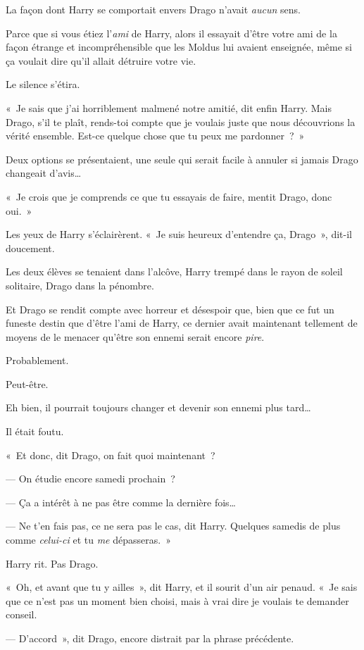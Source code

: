 La façon dont Harry se comportait envers Drago n'avait \emph{aucun} sens.

Parce que si vous étiez l'\emph{ami} de Harry, alors il essayait d'être votre ami de la façon étrange et incompréhensible que les Moldus lui avaient enseignée, même si ça voulait dire qu'il allait détruire votre vie.

Le silence s'étira.

«~Je sais que j'ai horriblement malmené notre amitié, dit enfin Harry. Mais Drago, s'il te plaît, rends-toi compte que je voulais juste que nous découvrions la vérité ensemble. Est-ce quelque chose que tu peux me pardonner~?~»

Deux options se présentaient, une seule qui serait facile à annuler si jamais Drago changeait d'avis…

«~Je crois que je comprends ce que tu essayais de faire, mentit Drago, donc oui.~»

Les yeux de Harry s'éclairèrent. «~Je suis heureux d'entendre ça, Drago~», dit-il doucement.

Les deux élèves se tenaient dans l'alcôve, Harry trempé dans le rayon de soleil solitaire, Drago dans la pénombre.

Et Drago se rendit compte avec horreur et désespoir que, bien que ce fut un funeste destin que d'être l'ami de Harry, ce dernier avait maintenant tellement de moyens de le menacer qu'être son ennemi serait encore \emph{pire}.

Probablement.

Peut-être.

Eh bien, il pourrait toujours changer et devenir son ennemi plus tard…

Il était foutu.

«~Et donc, dit Drago, on fait quoi maintenant~?

--- On étudie encore samedi prochain~?

--- Ça a intérêt à ne pas être comme la dernière fois…

--- Ne t'en fais pas, ce ne sera pas le cas, dit Harry. Quelques samedis de plus comme \emph{celui-ci} et tu \emph{me} dépasseras.~»

Harry rit. Pas Drago.

«~Oh, et avant que tu y ailles~», dit Harry, et il sourit d'un air penaud. «~Je sais que ce n'est pas un moment bien choisi, mais à vrai dire je voulais te demander conseil.

--- D'accord~», dit Drago, encore distrait par la phrase précédente.


